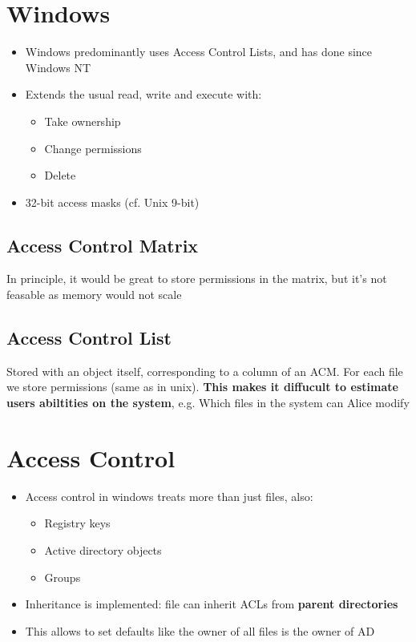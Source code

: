 \documentclass{article}
\begin{document}
\tableofcontents

\newpage

\section{Windows}
\begin{itemize}
  \item Windows predominantly uses Access Control Lists, and has done since Windows NT 
  \item Extends the usual read, write and execute with: 
  \begin{itemize}
  \item Take ownership 
  \item Change permissions 
  \item Delete 
  \end{itemize}
  \item 32-bit access masks (cf. Unix 9-bit)
\end{itemize}

\subsection{Access Control Matrix}
\begin{flushleft}
In principle, it would be great to store permissions in the matrix, but it's not feasable as memory would not scale
\end{flushleft}

\subsection{Access Control List}
\begin{flushleft}
Stored with an object itself, corresponding to a column of an ACM. For each file we store permissions (same as in unix). \textbf{This makes it diffucult to estimate users abiltities on the system}, e.g. Which files in the system can Alice modify
\end{flushleft}

\section{Access Control}
\begin{itemize}
  \item Access control in windows treats more than just files, also: 
  \begin{itemize}
  \item Registry keys 
  \item Active directory objects 
  \item Groups 
  \end{itemize}
  \item Inheritance is implemented: file can inherit ACLs from \textbf{parent directories}
  \item This allows to set defaults like the owner of all files is the owner of AD
\end{itemize}
\end{document}
